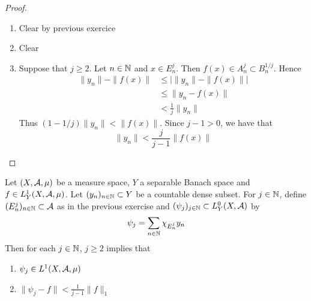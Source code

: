 \documentclass{book}
\begin{document}
	\begin{proof}\
		\begin{enumerate}
			\item Clear by previous exercice
			\item Clear
			\item Suppose that $j \geq 2$. Let $n \in \mathbb{N}$ and $x \in E_n^j$. Then $f(x) \in A_n^j \subset B_n^{1/j}$. Hence 
			\begin{align*}
				\|y_n\| - \|f(x)\|
				& \leq \bigg| \|y_n\| - \|f(x)\| \bigg| \\
				& \leq \|y_n - f(x)\| \\
				& < \frac{1}{j} \|y_n\|
			\end{align*}
			Thus $(1 - 1/j) \|y_n\| < \|f(x)\|$. Since $j-1 > 0$, we have that $$\|y_n\| < \frac{j}{j-1} \|f(x)\|$$
		\end{enumerate}
	\end{proof}
	
	\begin{ex}  
	Let $(X, \mathcal{A}, \mu)$ be a measure space, $Y$ a separable Banach space and $f \in L^1_Y(X, \mathcal{A}, \mu)$. Let $(y_n)_{n \in \mathbb{N}} \subset Y$ be a countable dense subset. For $j \in \mathbb{N}$, define $(E_n^j)_{n \in \mathbb{N}} \subset \mathcal{A}$ as in the previous exercise and $(\psi_j)_{j \in \mathbb{N}} \subset L^0_Y(X, \mathcal{A})$ by 
	$$\psi_j = \sum\limits_{n \in \mathbb{N}}\chi_{E_n^j}y_n$$  
	Then for each $j \in \mathbb{N}$, $j \geq 2$ implies that 
	\begin{enumerate}
		\item $\psi_j \in L^1(X, \mathcal{A}, \mu)$ 
		\item $\|\psi_j - f\| < \frac{1}{j - 1} \|f\|_1$
	\end{enumerate}
	\end{ex}
	
\end{document}
